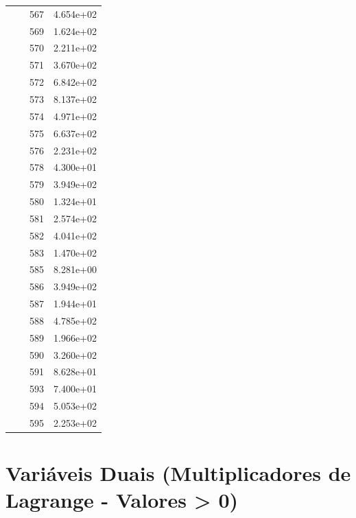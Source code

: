 \documentclass[12pt]{article}
\begin{document}
\begin{longtable}{@{}cccc@{}}
 &  & 567 & 4.654e+02 \\
 &  & 569 & 1.624e+02 \\
 &  & 570 & 2.211e+02 \\
 &  & 571 & 3.670e+02 \\
 &  & 572 & 6.842e+02 \\
 &  & 573 & 8.137e+02 \\
 &  & 574 & 4.971e+02 \\
 &  & 575 & 6.637e+02 \\
 &  & 576 & 2.231e+02 \\
 &  & 578 & 4.300e+01 \\
 &  & 579 & 3.949e+02 \\
 &  & 580 & 1.324e+01 \\
 &  & 581 & 2.574e+02 \\
 &  & 582 & 4.041e+02 \\
 &  & 583 & 1.470e+02 \\
 &  & 585 & 8.281e+00 \\
 &  & 586 & 3.949e+02 \\
 &  & 587 & 1.944e+01 \\
 &  & 588 & 4.785e+02 \\
 &  & 589 & 1.966e+02 \\
 &  & 590 & 3.260e+02 \\
 &  & 591 & 8.628e+01 \\
 &  & 593 & 7.400e+01 \\
 &  & 594 & 5.053e+02 \\
 &  & 595 & 2.253e+02 \\

\bottomrule
\end{longtable}


\section{Variáveis Duais (Multiplicadores de Lagrange - Valores > 0)}
\end{document}
